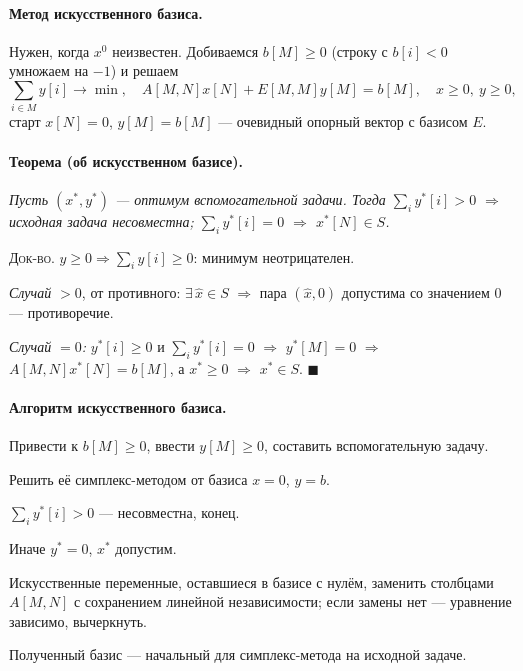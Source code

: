 \paragraph{Метод искусственного базиса.}
Нужен, когда $x^0$ неизвестен. Добиваемся $b[M] \ge 0$ (строку с $b[i] < 0$
умножаем на $-1$) и решаем
\[
  \sum_{i \in M} y[i] \to \min , \quad
  A[M,N]x[N] + E[M,M]y[M] = b[M] , \quad x \ge 0,\ y \ge 0 ,
\]
старт $x[N] = 0$, $y[M] = b[M]$ — очевидный опорный вектор с базисом $E$.

\paragraph{Теорема (об искусственном базисе).}
\textit{Пусть $(x^*, y^*)$ — оптимум вспомогательной задачи. Тогда
$\sum_i y^*[i] > 0$ $\Rightarrow$ исходная задача несовместна;
$\sum_i y^*[i] = 0$ $\Rightarrow$ $x^*[N] \in S$.}

\textsc{Док-во.} $y \ge 0 \Rightarrow \sum_i y[i] \ge 0$: минимум неотрицателен.

\emph{Случай $>0$}, от противного: $\exists\,\hat{x} \in S$ $\Rightarrow$ пара
$(\hat{x}, 0)$ допустима со значением $0$ — противоречие.

\emph{Случай $=0$:} $y^*[i] \ge 0$ и $\sum_i y^*[i] = 0$ $\Rightarrow$
$y^*[M] = 0$ $\Rightarrow$ $A[M,N]x^*[N] = b[M]$, а $x^* \ge 0$ $\Rightarrow$
$x^* \in S$. $\blacksquare$

\paragraph{Алгоритм искусственного базиса.}
\begin{csteps}
  \item Привести к $b[M] \ge 0$, ввести $y[M] \ge 0$, составить вспомогательную
        задачу.
  \item Решить её симплекс-методом от базиса $x = 0$, $y = b$.
  \item $\sum_i y^*[i] > 0$ — несовместна, конец.
  \item Иначе $y^* = 0$, $x^*$ допустим.
  \item Искусственные переменные, оставшиеся в базисе с нулём, заменить
        столбцами $A[M,N]$ с сохранением линейной независимости; если замены
        нет — уравнение зависимо, вычеркнуть.
  \item Полученный базис — начальный для симплекс-метода на исходной задаче.
\end{csteps}

